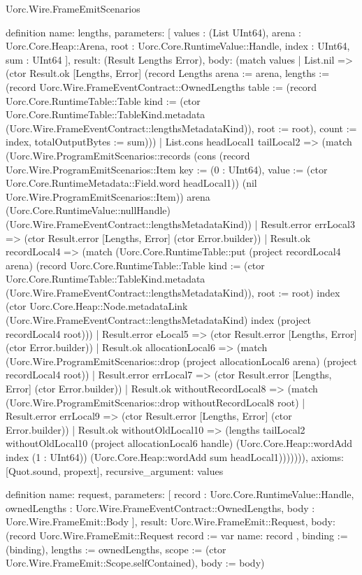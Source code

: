 \begin{lexlean}{Uorc.Wire.FrameEmitScenarios}
\begin{semanticmodule}
definition{
  name: lengths,
  parameters: [
    values : (List UInt64),
    arena : Uorc.Core.Heap::Arena,
    root : Uorc.Core.RuntimeValue::Handle,
    index : UInt64,
    sum : UInt64
  ],
  result: (Result Lengths Error),
  body: (match values
    | List.nil => (ctor Result.ok [Lengths, Error] (record Lengths {arena := arena, lengths := (record Uorc.Wire.FrameEventContract::OwnedLengths {table := (record Uorc.Core.RuntimeTable::Table {kind := (ctor Uorc.Core.RuntimeTable::TableKind.metadata (Uorc.Wire.FrameEventContract::lengthsMetadataKind)), root := root}), count := index, totalOutputBytes := sum})}))
    | List.cons headLocal1 tailLocal2 => (match (Uorc.Wire.ProgramEmitScenarios::records (cons (record Uorc.Wire.ProgramEmitScenarios::Item {key := (0 : UInt64), value := (ctor Uorc.Core.RuntimeMetadata::Field.word headLocal1)}) (nil Uorc.Wire.ProgramEmitScenarios::Item)) arena (Uorc.Core.RuntimeValue::nullHandle) (Uorc.Wire.FrameEventContract::lengthsMetadataKind))
      | Result.error errLocal3 => (ctor Result.error [Lengths, Error] (ctor Error.builder))
      | Result.ok recordLocal4 => (match (Uorc.Core.RuntimeTable::put (project recordLocal4 arena) (record Uorc.Core.RuntimeTable::Table {kind := (ctor Uorc.Core.RuntimeTable::TableKind.metadata (Uorc.Wire.FrameEventContract::lengthsMetadataKind)), root := root}) index (ctor Uorc.Core.Heap::Node.metadataLink (Uorc.Wire.FrameEventContract::lengthsMetadataKind) index (project recordLocal4 root)))
        | Result.error eLocal5 => (ctor Result.error [Lengths, Error] (ctor Error.builder))
        | Result.ok allocationLocal6 => (match (Uorc.Wire.ProgramEmitScenarios::drop (project allocationLocal6 arena) (project recordLocal4 root))
          | Result.error errLocal7 => (ctor Result.error [Lengths, Error] (ctor Error.builder))
          | Result.ok withoutRecordLocal8 => (match (Uorc.Wire.ProgramEmitScenarios::drop withoutRecordLocal8 root)
            | Result.error errLocal9 => (ctor Result.error [Lengths, Error] (ctor Error.builder))
            | Result.ok withoutOldLocal10 => (lengths tailLocal2 withoutOldLocal10 (project allocationLocal6 handle) (Uorc.Core.Heap::wordAdd index (1 : UInt64)) (Uorc.Core.Heap::wordAdd sum headLocal1))))))),
  axioms: [Quot.sound, propext],
  recursive_argument: values
}

definition{
  name: request,
  parameters: [
    record : Uorc.Core.RuntimeValue::Handle,
    ownedLengths : Uorc.Wire.FrameEventContract::OwnedLengths,
    body : Uorc.Wire.FrameEmit::Body
  ],
  result: Uorc.Wire.FrameEmit::Request,
  body: (record Uorc.Wire.FrameEmit::Request {record := var{
    name: record
  }, binding := (binding), lengths := ownedLengths, scope := (ctor Uorc.Wire.FrameEmit::Scope.selfContained), body := body})
}


\end{semanticmodule}
\end{lexlean}

